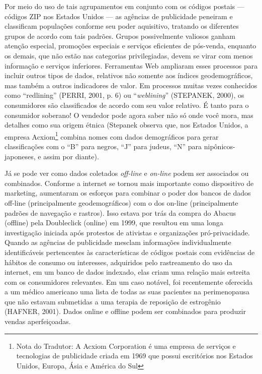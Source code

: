 Por meio do uso de tais agrupamentos em conjunto com os códigos postais
--- códigos ZIP nos Estados Unidos --- as agências de publicidade
peneiram e classificam populações conforme seu poder aquisitivo,
tratando os diferentes grupos de acordo com tais padrões. Grupos
possivelmente valiosos ganham atenção especial, promoções especiais e
serviços eficientes de pós-venda, enquanto os demais, que não estão nas
categorias privilegiadas, devem se virar com menos informação e serviços
inferiores. Ferramentas Web ampliaram esses processos para incluir
outros tipos de dados, relativos não somente aos índices
geodemográficos, mas também a outros indicadores de valor. Em processos
muitas vezes conhecidos como ``redlining'' (PERRI, 2001, p. 6) ou
``\emph{weblining}'' (STEPANEK, 2000), os consumidores são classificados
de acordo com seu valor relativo. É tanto para o consumidor soberano! O
vendedor pode agora saber não só onde você mora, mas detalhes como sua
origem étnica (Stepanek observa que, nos Estados Unidos, a empresa
Acxiom\footnote{Nota do Tradutor: A Acxiom Corporation é uma empresa de
  serviços e tecnologias de publicidade criada em 1969 que possui
  escritórios nos Estados Unidos, Europa, Ásia e América do Sul} combina
nomes com dados demográficos para gerar classificações com o ``B'' para
negros, ``J'' para judeus, ``N'' para nipônicos-japoneses, e assim por
diante).

Já se pode ver como dados coletados \emph{off-line} e \emph{on-line}
podem ser associados ou combinados. Conforme a internet se tornou mais
importante como dispositivo de marketing, aumentaram os esforços para
combinar o poder dos bancos de dados off-line (principalmente
geodemográficos) com o dos on-line (principalmente padrões de navegação
e rastros). Isso estava por trás da compra do Abacus (offline) pela
Doubleclick (online) em 1999, que resultou em uma longa investigação
iniciada após protestos de ativistas e organizações pró-privacidade.
Quando as agências de publicidade mesclam informações individualmente
identificáveis pertencentes às características de códigos postais com
evidências de hábitos de consumo ou interesses, adquiridos pelo
rastreamento do uso da internet, em um banco de dados indexado, elas
criam uma relação mais estreita com os consumidores relevantes. Em um
caso notável, foi recentemente oferecida a um médico americano uma lista
de todas as suas pacientes na perimenopausa que não estavam submetidas a
uma terapia de reposição de estrogênio (HAFNER, 2001). Dados online e
offline podem ser combinados para produzir vendas aperfeiçoadas.

